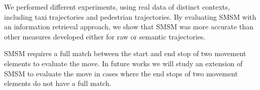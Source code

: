 \documentclass[12pt]{article}
\begin{document}
We performed different experiments, using real data of distinct contexts, including taxi trajectories and pedestrian trajectories. By evaluating SMSM with an information retrieval approach, we show that SMSM was more accurate than other measures developed either for raw or semantic trajectories.

SMSM requires a full match between the start and end stop of two movement elements to evaluate the move. In future works we will study an extension of SMSM to evaluate the move in cases where the end stops of two movement elements do not have a full match.



\end{document}

